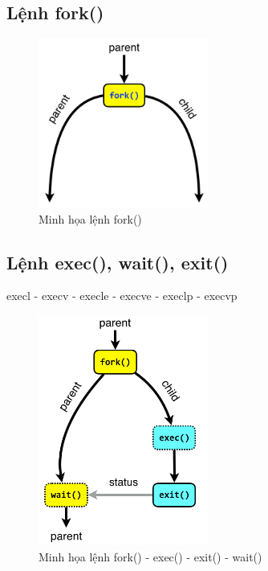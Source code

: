 \documentclass{article}
\begin{document}
\subsection{Lệnh fork()}

\begin{figure}[H]
\centering
\includegraphics[width=0.5\textwidth]{fork.png}
\caption{Minh họa lệnh fork()}
\end{figure}

\subsection{Lệnh exec(), wait(), exit()}
execl - execv - execle - execve - execlp - execvp

\begin{figure}[H]
\centering
\includegraphics[width=0.5\textwidth]{fork-exec-exit-wait.png}
\caption{Minh họa lệnh fork() - exec() - exit() - wait()}
\end{figure}
\end{document}

